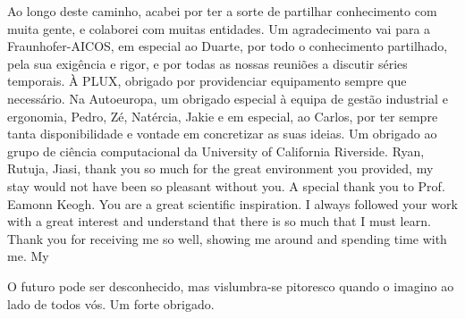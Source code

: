 \begin{ntacknowledgements}
Ao longo deste caminho, acabei por ter a sorte de partilhar conhecimento com muita gente, e colaborei com muitas entidades. Um agradecimento vai para a Fraunhofer-AICOS, em especial ao Duarte, por todo o conhecimento partilhado, pela sua exigência e rigor, e por todas as nossas reuniões a discutir séries temporais. À PLUX, obrigado por providenciar equipamento sempre que necessário. Na Autoeuropa, um obrigado especial à equipa de gestão industrial e ergonomia, Pedro, Zé, Natércia, Jakie e em especial, ao Carlos, por ter sempre tanta disponibilidade e vontade em concretizar as suas ideias.  Um obrigado ao grupo de ciência computacional da University of California Riverside. Ryan, Rutuja, Jiasi, thank you so much for the great environment you provided, my stay would not have been so pleasant without you. A special thank you to Prof. Eamonn Keogh. You are a great scientific inspiration. I always followed your work with a great interest and understand that there is so much that I must learn. Thank you for receiving me so well, showing me around and spending time with me. My 



O futuro pode ser desconhecido, mas vislumbra-se pitoresco quando o imagino ao lado de todos vós. Um forte obrigado.



\end{ntacknowledgements}